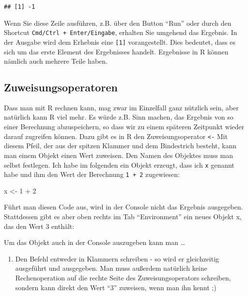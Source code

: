 \documentclass[
]{book}
\newenvironment{Shaded}{\begin{snugshade}}{\end{snugshade}}
\newcommand{\DecValTok}[1]{\textcolor[rgb]{0.00,0.00,0.81}{#1}}
\newcommand{\NormalTok}[1]{#1}
\newcommand{\OtherTok}[1]{\textcolor[rgb]{0.56,0.35,0.01}{#1}}
\newcommand{\SpecialCharTok}[1]{\textcolor[rgb]{0.00,0.00,0.00}{#1}}
\providecommand{\tightlist}{%
  \setlength{\itemsep}{0pt}\setlength{\parskip}{0pt}}
\begin{document}
\begin{verbatim}
## [1] -1
\end{verbatim}

Wenn Sie diese Zeile ausführen, z.B. über den Button ``Run'' oder durch den Shortcut \texttt{Cmd/Ctrl\ +\ Enter/Eingabe}, erhalten Sie umgehend das Ergebnis. In der Ausgabe wird dem Erhebnis eine \texttt{{[}1{]}} vorangestellt. Dies bedeutet, dass es sich um das erste Element des Ergebnisses handelt. Ergebnisse in R können nämlich auch mehrere Teile haben.

\hypertarget{zuweisungsoperatoren}{%
\subsection{Zuweisungsoperatoren}\label{zuweisungsoperatoren}}

Dass man mit R rechnen kann, mag zwar im Einzelfall ganz nützlich sein, aber natürlich kann R viel mehr. Es würde z.B. Sinn machen, das Ergebnis von so einer Berechnung abzuspeichern, so dass wir zu einem späteren Zeitpunkt wieder darauf zugreifen können. Dazu gibt es in R den Zuweisungsoperator \texttt{\textless{}-} Mit diesem Pfeil, der aus der spitzen Klammer und dem Bindestrich besteht, kann man einem Objekt einen Wert zuweisen. Den Namen des Objektes muss man selbst festlegen. Ich habe im folgenden ein Objekt erzeugt, dass ich \texttt{x} genannt habe und ihm den Wert der Berechnung \texttt{1\ +\ 2} zugewiesen:

\begin{Shaded}
\begin{Highlighting}[]
\NormalTok{x }\OtherTok{\textless{}{-}} \DecValTok{1} \SpecialCharTok{+} \DecValTok{2}
\end{Highlighting}
\end{Shaded}

Führt man diesen Code aus, wird in der Console nicht das Ergebnis ausgegeben. Stattdessen gibt es aber oben rechts im Tab ``Environment'' ein neues Objekt x, das den Wert 3 enthält:

Um das Objekt auch in der Console auszugeben kann man \ldots{}

\begin{enumerate}
\def\labelenumi{\arabic{enumi}.}
\tightlist
\item
  Den Befehl entweder in Klammern schreiben - so wird er gleichzeitig ausgeführt und ausgegeben. Man muss außerdem natürlich keine Rechenoperation auf die rechte Seite des Zuweisungsoperators schreiben, sondern kann direkt den Wert ``3'' zuweisen, wenn man ihn kennt ;)
\end{enumerate}
\end{document}
